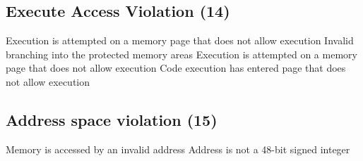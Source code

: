 \subsection{Execute Access Violation (14)}
           {Execution is attempted on a memory page that does not allow execution}
           {Invalid branching into the protected memory areas}
           {}
           {Execution is attempted on a memory page that does not allow execution}
           {Code execution has entered page that does not allow execution}
           {}          



\subsection{Address space violation (15)}
           {Memory is accessed by an invalid address}
           {Address is not a 48-bit signed integer}
           {}
